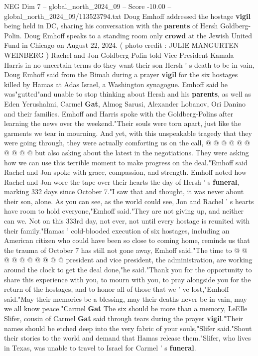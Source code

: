 \begin{textsample}{NEG Dim 7 – global\_north\_2024\_09 – Score -10.00 – global\_north\_2024\_09/113523794.txt}  \label{ex:f7_neg_016}
Doug Emhoff addressed the hostage \textbf{vigil} being held in DC, sharing his conversation with the \textbf{parents} of Hersh Goldberg-Polin.
Doug Emhoff speaks to a standing room only \textbf{crowd} at the Jewish United Fund in Chicago on August 22, 2024. ( photo credit : JULIE MANGURTEN WEINBERG ) Rachel and Jon Goldberg-Polin told Vice President Kamala Harris in no uncertain terms do they want their son Hersh ' s death to be in vain, Doug Emhoff said from the Bimah during a prayer \textbf{vigil} for the six hostages killed by Hamas at Adas Israel, a Washington synagogue.
Emhoff said he was"gutted"and unable to stop thinking about Hersh and his \textbf{parents}, as well as Eden Yerushalmi, Carmel \textbf{Gat}, Almog Sarusi, Alexander Lobanov, Ori Danino and their families.
Emhoff and Harris spoke with the Goldberg-Polins after learning the news over the weekend."Their souls were torn apart, just like the garments we tear in mourning.
And yet, with this unspeakable tragedy that they were going through, they were actually comforting us on the call, @ @ @ @ @ @ @ @ @ @ but also asking about the latest in the negotiations.
They were asking how we can use this terrible moment to make progress on the deal."Emhoff said Rachel and Jon spoke with grace, compassion, and strength.
Emhoff noted how Rachel and Jon wore the tape over their hearts the day of Hersh ' s \textbf{funeral}, marking 332 days since October 7."I saw that and thought, it was never about their son, alone.
As you can see, as the world could see, Jon and Rachel ' s hearts have room to hold everyone,"Emhoff said."They are not giving up, and neither can we.
Not on this 333rd day, not ever, not until every hostage is reunited with their family."Hamas ' cold-blooded execution of six hostages, including an American citizen who could have been so close to coming home, reminds us that the trauma of October 7 has still not gone away, Emhoff said."The time to @ @ @ @ @ @ @ @ @ @ president and vice president, the administration, are working around the clock to get the deal done,"he said."Thank you for the opportunity to share this experience with you, to mourn with you, to pray alongside you for the return of the hostages, and to honor all of those that we ' ve lost,"Emhoff said."May their memories be a blessing, may their deaths never be in vain, may we all know peace."Carmel \textbf{Gat} The six should be more than a memory, LeElle Slifer, cousin of Carmel \textbf{Gat} said through tears during the prayer \textbf{vigil}."Their names should be etched deep into the very fabric of your souls,"Slifer said."Shout their stories to the world and demand that Hamas release them."Slifer, who lives in Texas, was unable to travel to Israel for Carmel ' s \textbf{funeral}.

\end{textsample}

